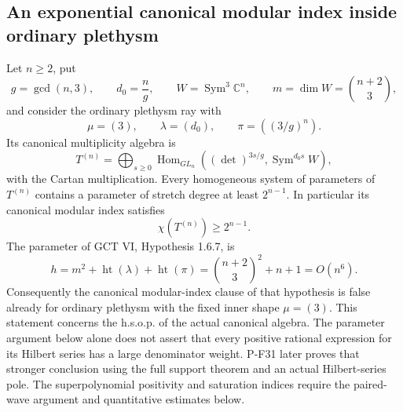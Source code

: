 \subsection{An exponential canonical modular index inside ordinary plethysm}

\begin{proposition}
\label{prop:cubiccanonicalcounterexample}
Let $n\ge2$, put
\[
 g=\gcd(n,3),\qquad d_0=\frac ng,\qquad
 W=\operatorname{Sym}^3\mathbb C^n,\qquad
 m=\dim W=\binom{n+2}{3},
\]
and consider the ordinary plethysm ray with
\[
 \mu=(3),\qquad \lambda=(d_0),\qquad
 \pi=((3/g)^n).
 \tag{P-F19a}
\]
Its canonical multiplicity algebra is
\[
 T^{(n)}=\bigoplus_{s\ge0}
  \operatorname{Hom}_{GL_n}
  \left((\det)^{3s/g},\operatorname{Sym}^{d_0s}W\right),
 \tag{P-F19b}
\]
with the Cartan multiplication. Every homogeneous system of parameters
of $T^{(n)}$ contains a parameter of stretch degree at least
$2^{n-1}$. In particular its canonical modular index satisfies
\[
 \chi(T^{(n)})\ge2^{n-1}.
 \tag{P-F19c}
\]
The parameter of GCT VI, Hypothesis 1.6.7, is
\[
 h=m^2+\operatorname{ht}(\lambda)+\operatorname{ht}(\pi)
   =\binom{n+2}{3}^{\!2}+n+1=O(n^6).
 \tag{P-F19d}
\]
Consequently the canonical modular-index clause of that hypothesis
is false already for ordinary plethysm with the fixed inner shape
$\mu=(3)$. This statement concerns the h.s.o.p. of the actual canonical algebra.
The parameter argument below alone does not assert that every positive
rational expression for its Hilbert series has a large denominator
weight. P-F31 later proves that stronger conclusion using the full
support theorem and an actual Hilbert-series pole. The superpolynomial positivity and saturation indices
require the paired-wave argument and quantitative estimates below.
\end{proposition}

